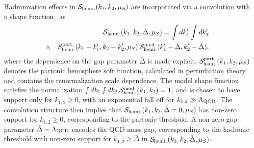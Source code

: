 \documentclass[prd,aps,nofootinbib,twocolumn,showpacs,amsmath,superscriptaddress]{revtex4-2}
\newcommand{\nn}{\nonumber}
\newcommand{\bea}{\begin{eqnarray}}
\newcommand{\eea}{\end{eqnarray}}
\begin{document}
Hadronization effects in ${\cal S}_{\rm hemi.}(k_1,k_2,\mu_S)$ are incorporated via a convolution with a  shape function~\cite{Hoang:2007vb} as
\bea
\label{eq:hemiconvgap}
 &&{\cal S}_{\rm hemi.}(k_1,k_2,\bar{\Delta},\mu_S) = \int dk_1' \int dk_2'  \\
 &\times&  {\cal S}_{\rm hemi.}^{\rm part.}(k_1-k_1',k_2-k_2',\mu_S) \>{\cal S}_{\rm hemi.}^{\rm mod.}(k_1'-\bar{\Delta},k_2'-\bar{\Delta}) . \nn
\eea
where the dependence on the gap parameter $\bar{\Delta}$ is made explicit.    ${\cal S}_{\rm hemi.}^{\rm part.}(k_1,k_2,\mu_S)$ denotes the partonic hemisphere soft function, calculated in perturbation theory and contains the renormalization scale dependence.  The model shape function satisfies the normalization $\int dk_1\int dk_2 \>{\cal S}_{\rm hemi.}^{\rm mod.}(k_1,k_2) =1$, and is chosen to have support only for $k_{1,2}\geq 0$, with an exponential fall off for $k_{1,2}\gg \Lambda_{\rm QCD}$. The convolution structure then implies  that  ${\cal S}_{\rm hemi.}(k_1,k_2,\bar{\Delta}=0,\mu_S)$ has non-zero support for $k_{1,2}\geq 0$, corresponding to the partonic threshold.  A non-zero gap parameter $\bar{\Delta}\sim \Lambda_{\rm QCD}$  encodes the QCD mass gap, corresponding to the hadronic threshold with non-zero support for $k_{1,2}\geq \bar{\Delta}$ in ${\cal S}_{\rm hemi.}(k_1,k_2,\bar{\Delta},\mu_S)$.
\end{document}
